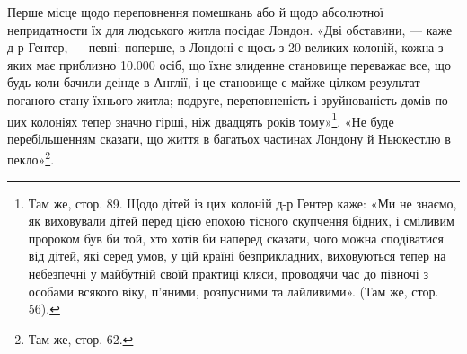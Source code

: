 Перше місце щодо переповнення помешкань або й щодо абсолютної
непридатности їх для людського житла посідає Лондон.
«Дві обставини, — каже д-р Гентер, — певні: поперше, в Лондоні
є щось з 20 великих колоній, кожна з яких має приблизно
\num{10.000}  осіб, що їхнє злиденне становище переважає все, що будь-коли
бачили деінде в Англії, і це становище є майже цілком результат
поганого стану їхнього житла; подруге, переповненість і зруйнованість
домів по цих колоніях тепер значно гірші, ніж двадцять
років тому»\footnote{
Там же, стор. 89. Щодо дітей із цих колоній д-р Гентер каже:
«Ми не знаємо, як виховували дітей перед цією епохою тісного скупчення
бідних, і сміливим пророком був би той, хто хотів би наперед сказати,
чого можна сподіватися від дітей, які серед умов, у цій країні безприкладних,
виховуються тепер на небезпечні у майбутній своїй практиці кляси,
проводячи час до півночі з особами всякого віку, п'яними, розпусними та
лайливими». (Там же, стор. 56).
}. «Не буде перебільшенням сказати, що
життя в багатьох частинах Лондону й Ньюкестлю в пекло»\footnote{
Там же, стор. 62.
}.

